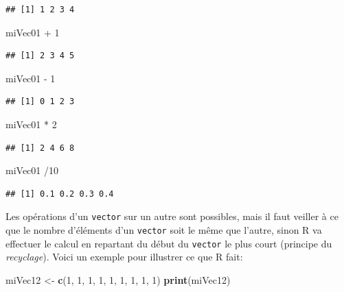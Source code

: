 \documentclass[twoside,symmetric]{book}
\newenvironment{Shaded}{}{}
\newcommand{\DecValTok}[1]{#1}
\newcommand{\KeywordTok}[1]{\textbf{#1}}
\newcommand{\NormalTok}[1]{#1}
\newcommand{\OperatorTok}[1]{#1}
\newcommand{\StringTok}[1]{#1}
\begin{document}
\begin{verbatim}
## [1] 1 2 3 4
\end{verbatim}

\begin{Shaded}
\begin{Highlighting}[]
\NormalTok{miVec01 }\OperatorTok{+}\StringTok{ }\DecValTok{1}
\end{Highlighting}
\end{Shaded}

\begin{verbatim}
## [1] 2 3 4 5
\end{verbatim}

\begin{Shaded}
\begin{Highlighting}[]
\NormalTok{miVec01 }\OperatorTok{-}\StringTok{ }\DecValTok{1}
\end{Highlighting}
\end{Shaded}

\begin{verbatim}
## [1] 0 1 2 3
\end{verbatim}

\begin{Shaded}
\begin{Highlighting}[]
\NormalTok{miVec01 }\OperatorTok{*}\StringTok{ }\DecValTok{2}
\end{Highlighting}
\end{Shaded}

\begin{verbatim}
## [1] 2 4 6 8
\end{verbatim}

\begin{Shaded}
\begin{Highlighting}[]
\NormalTok{miVec01 }\OperatorTok{/}\DecValTok{10}
\end{Highlighting}
\end{Shaded}

\begin{verbatim}
## [1] 0.1 0.2 0.3 0.4
\end{verbatim}

Les opérations d'un \texttt{vector} sur un autre sont possibles, mais il faut veiller à ce que le nombre d'éléments d'un \texttt{vector} soit le même que l'autre, sinon R va effectuer le calcul en repartant du début du \texttt{vector} le plus court (principe du \emph{recyclage}). Voici un exemple pour illustrer ce que R fait:

\begin{Shaded}
\begin{Highlighting}[]
\NormalTok{miVec12 <-}\StringTok{ }\KeywordTok{c}\NormalTok{(}\DecValTok{1}\NormalTok{, }\DecValTok{1}\NormalTok{, }\DecValTok{1}\NormalTok{, }\DecValTok{1}\NormalTok{, }\DecValTok{1}\NormalTok{, }\DecValTok{1}\NormalTok{, }\DecValTok{1}\NormalTok{, }\DecValTok{1}\NormalTok{, }\DecValTok{1}\NormalTok{)}
\KeywordTok{print}\NormalTok{(miVec12)}
\end{Highlighting}
\end{Shaded}
\end{document}
